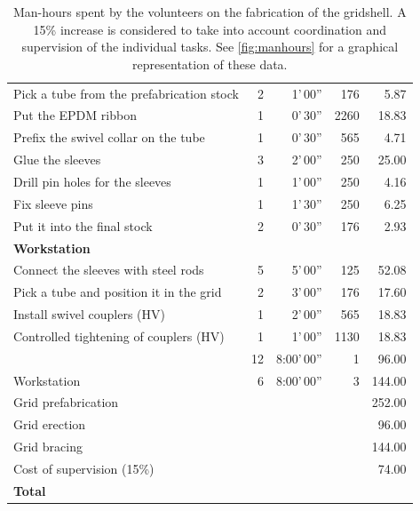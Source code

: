 \begin{table}[h]
\begin{fullpage}
\begin{tabularx}{\textwidth}{@{}Xrrrr@{}}
	Pick a tube from the prefabrication stock			& 2 			& 1'\,00''			& 176			& 5.87 			\\ 
	Put the EPDM ribbon						& 1 			& 0'\,30''			& 2260			& 18.83 			\\ 
	Prefix the swivel collar on the tube				& 1 			& 0'\,30''			& 565			& 4.71 			\\ 
	Glue	the sleeves							& 3  			& 2'\,00''			& 250			& 25.00			\\
	Drill pin holes for the sleeves					& 1  			& 1'\,00''			& 250			& 4.16			\\
	Fix sleeve pins 								& 1  			& 1'\,30''			& 250			& 6.25			\\
	Put it into the final stock						& 2  			& 0'\,30''			& 176			& 2.93 			\\ 
	\addlinespace[10pt]
	\textbf{Workstation \textquote{Site Assembly}}		&  \tablebf{12}   &				& 				& \tablebf{107.34} 	\\ 
	Connect the sleeves with steel rods 				& 5 			& 5'\,00''			& 125			& 52.08 			\\ 
	Pick a tube and position it in the grid 				& 2 			& 3'\,00''			& 176			& 17.60 			\\ 
	Install swivel couplers (HV)					& 1 			& 2'\,00''			& 565			& 18.83 			\\
	Controlled tightening of couplers (HV)			& 1 			& 1'\,00''			& 1130			& 18.83 			\\ 
	\addlinespace[10pt]
	{Workstation \textquote{Grid Erection}}			& {12}   		& 8:00'\,00''		& 1				& {96.00} 	\\ 
	{Workstation \textquote{Grid Bracing}}			& {6}   		& 8:00'\,00''		& 3				& {144.00} 	\\ 
	\addlinespace[10pt]
	\midrule
	Grid prefabrication 							& 			& 				&				&{252.00}  		\\
	Grid erection 								& 			& 				&				&{96.00}  			\\
	Grid bracing 								& 			& 				&				&{144.00}  		\\
	Cost of supervision (15\%)					& 			&				&				& {74.00}  			\\
	\textbf{Total} 								& 			& 				&				& \tablebf{566.00}  	\\
	\bottomrule
 	\end{tabularx}
	\vspace{10pt}
	\caption[Man-hours spent by the volunteers on the fabrication]{Man-hours spent by the volunteers on the fabrication of the gridshell. A 15\% increase is considered to take into account coordination and supervision of the individual tasks. See \cref{fig:manhours} for a graphical representation of these data.}
	\label{tab:manhours}
\end{fullpage}
\end{table}

